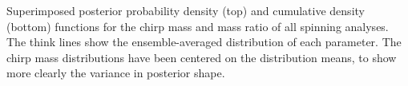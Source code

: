 Superimposed posterior probability density (top) and cumulative density (bottom) functions for the chirp mass and mass ratio of all spinning analyses.  The think lines show the ensemble-averaged distribution of each parameter.  The chirp mass distributions have been centered on the distribution means, to show more clearly the variance in posterior shape.